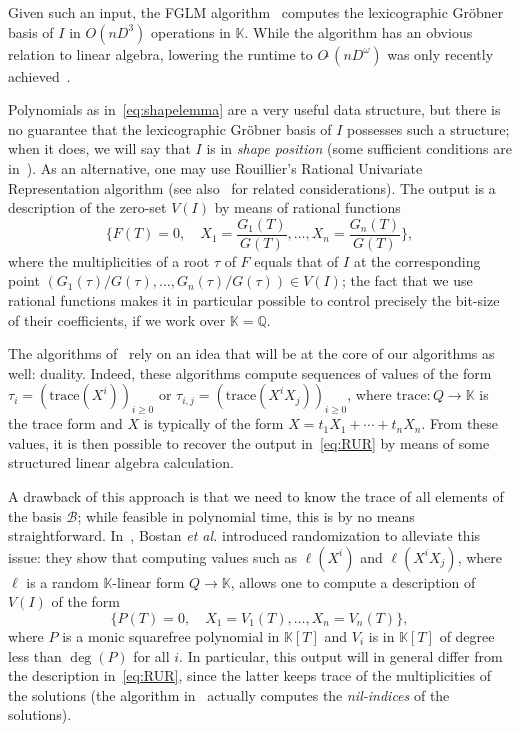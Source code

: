 \documentclass[12pt]{article}
\newcommand{\basis}{\mathscr{B}}
\newcommand{\trace}{\mathrm{trace}}
\def\Q {\ensuremath{\mathbb{Q}}}
\def\K{\mathbb{K}}
\def\K {\ensuremath{\mathbb{K}}}
\begin{document}
Given such an input, the FGLM algorithm~\cite{FaGiLaMo93} computes the
lexicographic Gr\"obner basis of $I$ in $O(nD^3)$ operations in $\K$.
While the algorithm has an obvious relation to linear algebra,
lowering the runtime to $O\tilde{~}(nD^\omega)$ was only recently
achieved~\cite{FaGaHuRe13,FaGaHuRe14,Neiger16}. 

Polynomials as in~\eqref{eq:shapelemma} are a very useful data
structure, but there is no guarantee that the lexicographic Gr\"obner
basis of $I$ possesses such a structure; when it does, we will say
that $I$ is in {\em shape position} (some sufficient conditions are
in~\cite{BeMoMaTr94}). As an alternative, one may use Rouillier's
Rational Univariate Representation algorithm \cite{Rouillier99} (see
also~\cite{AlBeRoWo94,BeWo96} for related considerations). The output
is a description of the zero-set $V(I)$ by means of rational functions
\begin{equation}\label{eq:RUR}
 \{  F(T)=0, \quad X_1 = \frac{G_1(T)}{G(T)}, \dots,X_n = \frac{G_n(T)}{G(T)} \},
\end{equation}
where the multiplicities of a root $\tau$ of $F$ equals that of
$I$ at the corresponding point
$(G_1(\tau)/G(\tau),\dots,G_n(\tau)/G(\tau)) \in V(I)$; the fact that
we use rational functions makes it in particular possible to control
precisely the bit-size of their coefficients, if we work over $\K=\Q$.

The algorithms of~\cite{AlBeRoWo94, BeWo96, Rouillier99} rely on an
idea that will be at the core of our algorithms as well: duality.
Indeed, these algorithms compute sequences of values of the form
$\tau_i=(\trace(X^i))_{i \ge 0}$ or 
$\tau_{i,j}=(\trace(X^i X_j))_{i \ge 0}$, where $\trace: Q \to \K$ is the trace 
form and $X$ is typically of the form $X=t_1 X_1 + \cdots + t_n X_n$.
From these values, it is then possible to recover the output
in~\eqref{eq:RUR} by means of some structured linear algebra calculation.

A drawback of this approach is that we need to know the trace of all
elements of the basis $\basis$; while feasible in polynomial time,
this is by no means straightforward. In~\cite{BoSaSc03}, Bostan {\it
  et al.} introduced randomization to alleviate this issue: they show
that computing values such as $\ell(X^i)$ and $\ell(X^i X_j)$, where $\ell$ is
a random $\K$-linear form $Q \to \K$, allows one to compute a
description of $V(I)$ of the form
\begin{equation}\label{eq:BoSaSc03}
 \{  P(T)=0, \quad X_1 = V_1(T), \dots,X_n = V_n(T) \},
\end{equation}
where $P$ is a monic squarefree polynomial in $\K[T]$ and $V_i$ is in
$\K[T]$ of degree less than $\deg(P)$ for all $i$.  In particular,
this output will in general differ from the description
in~\eqref{eq:RUR}, since the latter keeps trace of the multiplicities
of the solutions (the algorithm in~\cite{BoSaSc03} actually computes
the {\em nil-indices} of the solutions).
\end{document}
